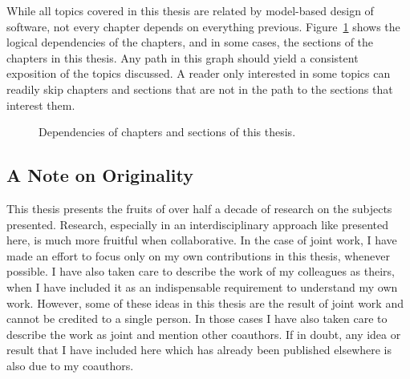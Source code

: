 While all topics covered in this thesis are related by model-based design of software, not every chapter depends on everything previous.
Figure~\ref{fig:chapter_dependencies} shows the logical dependencies of the chapters, and in some cases, the sections of the chapters in this thesis.
Any path in this graph should yield a consistent exposition of the topics discussed. 
A reader only interested in some topics can readily skip chapters and sections that are not in the path to the sections that interest them.

\begin{figure}[h]
	\centering
   \resizebox{0.95\textwidth}{!}{}
   \caption{Dependencies of chapters and sections of this thesis.}
	\label{fig:chapter_dependencies}
\end{figure}


\subsection{A Note on Originality}

This thesis presents the fruits of over half a decade of research on the subjects presented.
Research, especially in an interdisciplinary approach like presented here, is much more fruitful when collaborative.
In the case of joint work, I have made an effort to focus only on my own contributions in this thesis, whenever possible.
I have also taken care to describe the work of my colleagues as theirs, when I have included it as an indispensable requirement to understand my own work.
However, some of these ideas in this thesis are the result of joint work and cannot be credited to a single person.
In those cases I have also taken care to describe the work as joint and mention other coauthors.
If in doubt, any idea or result that I have included here which has already been published elsewhere is also due to my coauthors.

%


